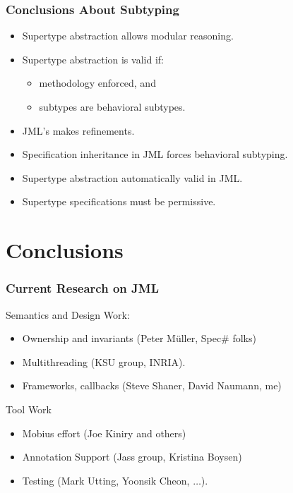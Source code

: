 \begin{frame}
\frametitle{Conclusions About Subtyping}
\begin{itemize}
\item
Supertype abstraction allows modular reasoning.

\item
Supertype abstraction is valid if:
\begin{itemize}
\item
methodology enforced, and

\item
subtypes are behavioral subtypes.
\end{itemize}

\item
JML's  makes refinements.

\item
Specification inheritance in JML
forces behavioral subtyping.

\item
Supertype abstraction 
automatically valid in JML.

\item
Supertype specifications must be permissive.
\end{itemize}
\end{frame}

\section[Concl.]{Conclusions}



\begin{frame}
\frametitle{Current Research on JML}

Semantics and Design Work:
\begin{itemize}
\item
Ownership and invariants (Peter M\"{u}ller, Spec\# folks)

\item
Multithreading (KSU group, INRIA).

\item
Frameworks, callbacks (Steve Shaner, David Naumann, me)
\end{itemize}

Tool Work
\begin{itemize}
\item
Mobius effort (Joe Kiniry and others)

\item
Annotation Support (Jass group, Kristina Boysen)

\item
Testing (Mark Utting, Yoonsik Cheon, $\ldots$).
\end{itemize}
\end{frame}


